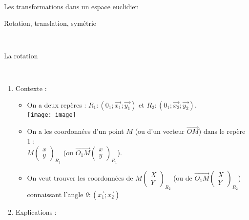 \documentclass[11]{article}
\newcommand\coordo[2]{\begin{pmatrix} #1 \\#2 \end{pmatrix}}
\begin{document}
\begin{center}
\begin{Large}
Les transformations dans un espace euclidien \\
\end{Large}
\end{center}
\begin{center}
\begin{Large}
Rotation, translation, symétrie \\
\end{Large}
\end{center}


\hrulefill \\

\begin{enumerate}
\begin{Large} \item La rotation \end{Large} \\

\begin{enumerate}
\item Contexte : \\
\begin{itemize}
\item On a deux repères : $R_1:(0_1;\overrightarrow{x_1};\overrightarrow{y_1})$ et $R_2:(0_1;\overrightarrow{x_2};\overrightarrow{y_2})$. \\
\texttt{[image: image]}
\item On a les coordonnées d'un point $M$ (ou d'un vecteur $\overrightarrow{OM}$) dans le repère 1 : \\ $M\coordo{x}{y}_{R_1}$ (ou $\overrightarrow{O_1M}\coordo{x}{y}_{R_1}$).
\item On veut trouver les coordonnées de $M\coordo{X}{Y}_{R_2}$ (ou de $\overrightarrow{O_1M}\coordo{X}{Y}_{R_2}$) connaissant l'angle $\theta:(\overrightarrow{x_1};\overrightarrow{x_2})$
\end{itemize}

\item Explications : \\


\end{enumerate}
\end{enumerate}
\end{document}
